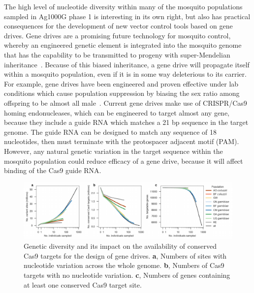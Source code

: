 \documentclass[a4paper,11pt,abstracton,hidelinks]{scrartcl}
\begin{document}
The high level of nucleotide diversity within many of the mosquito populations sampled in Ag1000G phase 1 is interesting in its own right, but also has practical consequences for the development of new vector control tools based on gene drives.
%
Gene drives are a promising future technology for mosquito control, whereby an engineered genetic element is integrated into the mosquito genome that has the capability to be transmitted to progeny with super-Mendelian inheritance~\parencite{Burt2003}.
%
Because of this biased inheritance, a gene drive will propagate itself within a mosquito population, even if it is in some way deleterious to its carrier.
%
For example, gene drives have been engineered and proven effective under lab conditions which cause population suppression by biasing the sex ratio among offspring to be almost all male~\parencite{Kyrou2018}.
%
Current gene drives make use of CRISPR/Cas9 homing endonucleases, which can be engineered to target almost any gene, because they include a guide RNA which matches a 21 bp sequence in the target genome.
%
The guide RNA can be designed to match any sequence of 18 nucleotides, then must terminate with the protospacer adjacent motif (PAM).
%
However, any natural genetic variation in the target sequence within the mosquito population could reduce efficacy of a gene drive, because it will affect binding of the Cas9 guide RNA.
%


\begin{figure}[t!]
\centering
\includegraphics[width=1.1\textwidth,center]{artwork/chapter4/cas9_targets.pdf}
\caption{Genetic diversity and its impact on the availability of conserved Cas9 targets for the design of gene drives.
%
\textbf{a}, Numbers of sites with nucleotide variation across the whole genome.
%
\textbf{b}, Numbers of Cas9 targets with no nucleotide variation.
%
\textbf{c}, Numbers of genes containing at least one conserved Cas9 target site.
%
}
\label{fig:cas9}
\end{figure}
\end{document}
